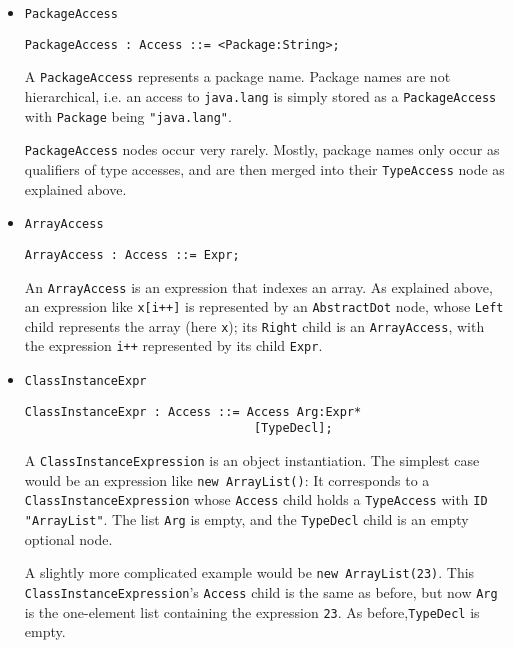 \documentclass{article}
\newcommand{\nt}[1]{\texttt{#1}}
\newcommand{\child}[1]{\texttt{#1}}
\newcommand{\code}[1]{\lstinline$#1$}
\begin{document}
\begin{itemize}
\item \nt{PackageAccess}
  \begin{lstlisting}[frame=single]
 PackageAccess : Access ::= <Package:String>;
  \end{lstlisting}

  A \nt{PackageAccess} represents a package name. Package names are not
  hierarchical, i.e. an access to \nt{java.lang} is simply stored as a
  \nt{PackageAccess} with \child{Package} being \code{"java.lang"}.

  \nt{PackageAccess} nodes occur very rarely. Mostly, package names only
  occur as qualifiers of type accesses, and are then merged into their
  \nt{TypeAccess} node as explained above.

\item \nt{ArrayAccess}
  \begin{lstlisting}[frame=single]
 ArrayAccess : Access ::= Expr;
  \end{lstlisting}

  An \nt{ArrayAccess} is an expression that indexes an array. As
  explained above, an expression like \code{x[i++]} is represented by
  an \code{AbstractDot} node, whose \code{Left} child represents the
  array (here \code{x}); its \code{Right} child is an \code{ArrayAccess},
  with the expression \code{i++} represented by its child \code{Expr}.


\item \nt{ClassInstanceExpr}
  \begin{lstlisting}[frame=single]
 ClassInstanceExpr : Access ::= Access Arg:Expr* 
                                [TypeDecl];
  \end{lstlisting}

  A \nt{ClassInstanceExpression} is an object instantiation. The simplest
  case would be an expression like \code{new ArrayList()}: It corresponds
  to a\linebreak
  \nt{ClassInstanceExpression} whose \child{Access} child holds
  a \nt{TypeAccess} with \child{ID} \code{"ArrayList"}. The list \child{Arg}
  is empty, and the \child{TypeDecl} child is an empty optional node.

  A slightly more complicated example would be \code{new ArrayList(23)}.
  This \nt{ClassInstanceExpression}'s \child{Access} child is the same as
  before, but now \child{Arg} is the one-element list containing
  the expression \code{23}. As before,\linebreak \child{TypeDecl} is empty.


\end{itemize}
\end{document}
